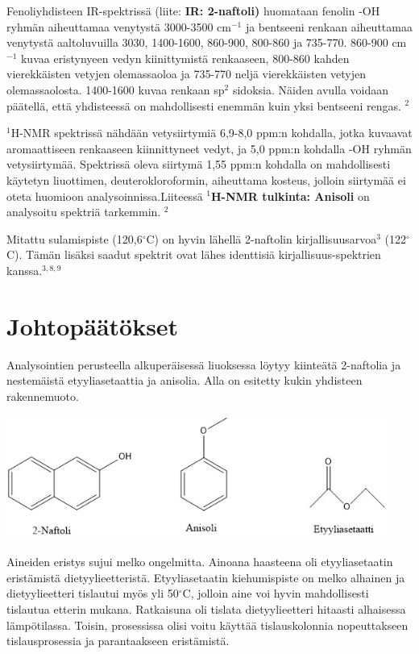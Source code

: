 \documentclass[11pt,a4paper]{article}
\begin{document}
 Fenoliyhdisteen IR-spektrissä (liite: \textbf{IR: 2-naftoli)} huomataan fenolin -OH ryhmän aiheuttamaa venytystä 3000-3500 cm$^{-1}$ ja bentseeni renkaan aiheuttamaa venytystä aaltoluvuilla 3030, 1400-1600, 860-900, 800-860 ja 735-770. 860-900 cm$^{-1}$ kuvaa eristynyeen vedyn kiinittymistä renkaaseen, 800-860 kahden vierekkäisten vetyjen olemassaoloa ja 735-770 neljä vierekkäisten vetyjen olemassaolosta. 1400-1600 kuvaa renkaan sp$^2$ sidoksia. Näiden avulla voidaan päätellä, että yhdisteessä on mahdollisesti enemmän kuin yksi bentseeni rengas. $^2$

$^1$H-NMR spektrissä nähdään vetysiirtymiä 6,9-8,0 ppm:n kohdalla, jotka kuvaavat aromaattiseen renkaaseen kiinnittyneet vedyt, ja 5,0 ppm:n kohdalla -OH ryhmän vetysiirtymää. Spektrissä oleva siirtymä 1,55 ppm:n kohdalla on mahdollisesti käytetyn liuottimen, deuterokloroformin, aiheuttama kosteus, jolloin siirtymää ei oteta huomioon analysoinnissa.Liiteessä \textbf{$^1$H-NMR tulkinta: Anisoli} on analysoitu spektriä tarkemmin. $^2$

Mitattu sulamispiste (120,6$^\circ$C) on hyvin lähellä 2-naftolin kirjallisuusarvoa$^3$ (122$^\circ$C). Tämän lisäksi saadut spektrit ovat lähes identtisiä kirjallisuus-spektrien kanssa.$^{3,8,9}$

\section{Johtopäätökset}


Analysointien perusteella alkuperäisessä liuoksessa löytyy kiinteätä 2-naftolia ja nestemäistä etyyliasetaattia ja anisolia. Alla on esitetty kukin yhdisteen rakennemuoto. 

\vspace{0.3cm}

\hspace{-0.5cm}\includegraphics[width=12.5cm]{analyysi.jpg}

\vspace{0.3cm}

Aineiden eristys sujui melko ongelmitta. Ainoana haasteena oli etyyliasetaatin eristämistä dietyylieetteristä. Etyyliasetaatin kiehumispiste on melko alhainen ja dietyylieetteri tislautui myös yli 50$^\circ$C, jolloin aine voi hyvin mahdollisesti tislautua etterin mukana. Ratkaisuna oli tislata dietyylieetteri hitaasti alhaisessa lämpötilassa. Toisin, prosessissa olisi voitu käyttää tislauskolonnia nopeuttakseen tislausprosessia ja parantaakseen eristämistä. 
\end{document}
